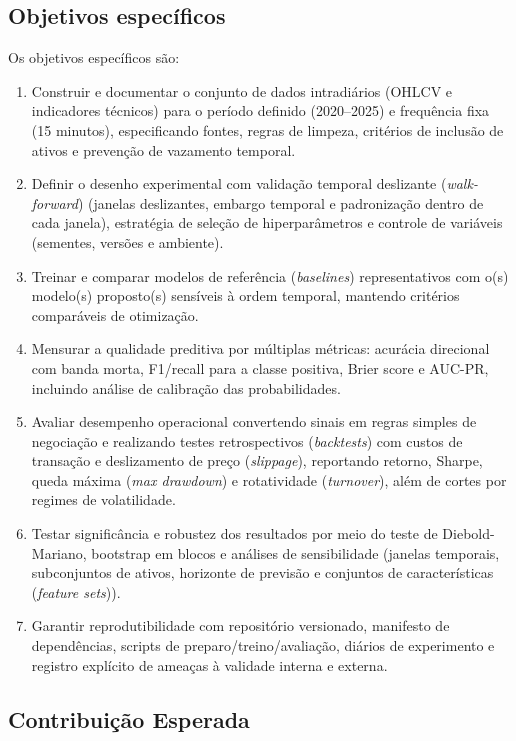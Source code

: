\subsection{Objetivos específicos}
Os objetivos específicos são:
\begin{enumerate}
  \item Construir e documentar o conjunto de dados intradiários (OHLCV e indicadores técnicos) para o período definido (2020--2025) e frequência fixa (15 minutos), especificando fontes, regras de limpeza, critérios de inclusão de ativos e prevenção de vazamento temporal.
  \item Definir o desenho experimental com validação temporal deslizante (\textit{walk-forward}) (janelas deslizantes, embargo temporal e padronização dentro de cada janela), estratégia de seleção de hiperparâmetros e controle de variáveis (sementes, versões e ambiente).
  \item Treinar e comparar modelos de referência (\textit{baselines}) representativos com o(s) modelo(s) proposto(s) sensíveis à ordem temporal, mantendo critérios comparáveis de otimização.
  \item Mensurar a qualidade preditiva por múltiplas métricas: acurácia direcional com banda morta, F1/recall para a classe positiva, Brier score e AUC-PR, incluindo análise de calibração das probabilidades.
  \item Avaliar desempenho operacional convertendo sinais em regras simples de negociação e realizando testes retrospectivos (\textit{backtests}) com custos de transação e deslizamento de preço (\textit{slippage}), reportando retorno, Sharpe, queda máxima (\textit{max drawdown}) e rotatividade (\textit{turnover}), além de cortes por regimes de volatilidade.
  \item Testar significância e robustez dos resultados por meio do teste de Diebold-Mariano, bootstrap em blocos e análises de sensibilidade (janelas temporais, subconjuntos de ativos, horizonte de previsão e conjuntos de características (\textit{feature sets})).
  \item Garantir reprodutibilidade com repositório versionado, manifesto de dependências, scripts de preparo/treino/avaliação, diários de experimento e registro explícito de ameaças à validade interna e externa.
\end{enumerate}




\subsection{Contribuição Esperada}



